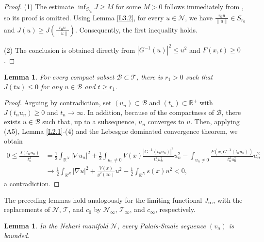\documentclass[10pt,a4paper]{amsart}
\numberwithin{equation}{section}
\newtheorem{lemma}[theorem]{Lemma}
\begin{document}
\begin{proof}
(1) The estimate $\inf_{S_{r_0}}J\geq M$ for some $M>0$ follows immediately from 
\cite[Lemma 2.1]{shen},  so its proof is omitted. Using Lemma \ref{L3.2}, for every 
$u\in\mathcal{N}$, we have $\frac{r_0u}{\|u\|}\in S_{r_0}$ and 
$J(u)\geq J(\frac{r_0u}{\|u\|})$. Consequently, the first inequality holds.

(2)  The conclusion is obtained directly from $|G^{-1}(u)|^2\leq u^2$ and $F(x,t)\geq0$.
\end{proof}


\begin{lemma}\label{L3.4} 
For every compact subset  $\mathcal{B}\subset \mathcal{T}$, there is $r_1>0$ such that 
$J(tu)\leq 0$ for any $u\in\mathcal{B}$ and $t\geq r_1$.
\end{lemma}

\begin{proof}
Arguing by contradiction, set $(u_n)\subset \mathcal{B}$ and $(t_n)\subset \mathbb{R}^+$ with 
$J(t_nu_n)\geq 0$ and  $t_n\to\infty$. In addition, because of the compactness of 
$\mathcal{B}$, there exists $u \in \mathcal{B}$ such that, up to a subsequence, 
$u_n$ converges to $u$. Then, applying (A5), Lemma \ref{L2.1}-(4)  and the Lebesgue 
dominated convergence theorem, we obtain
\begin{align*}
0\leq\frac{J(t_nu_n)}{t^2_n}
&=\frac{1}{2}\int_{\mathbb{R}^N}|\nabla u_n|^2
+\frac{1}{2}\int_{u_n\neq 0}V(x)\frac{|G^{-1}(t_nu_n)|^2}{t^2_nu^2_n}u^2_n
 -\int_{u_n\neq 0}\frac{F(x,G^{-1}(t_nu_n))}{t^2_nu^2_n}u^2_n \\
&\to \frac{1}{2}\int_{\mathbb{R}^N}|\nabla u|^2+\frac{V(x)}{g^2(\infty)}u^2-\frac{1}{2}\int_{\mathbb{R}^N}s(x)u^2<0,
\end{align*}
a contradiction.
\end{proof}

The preceding lemmas hold analogously for the limiting functional $J_\infty$, 
with the replacements of $\mathcal{N}$, $\mathcal{T}$, and $c_0$ by $\mathcal{N_\infty}$, 
$\mathcal{T_\infty}$, and $c_\infty$, respectively.

\begin{lemma}\label{L3.5} 
In the Nehari manifold $\mathcal{N}$, every Palais‑Smale sequence $(v_n)$  is bounded.
\end{lemma}
\end{document}
